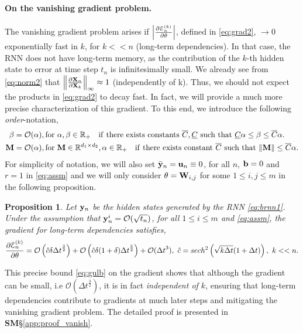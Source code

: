 \documentclass{article} \usepackage{iclr2021_conference,times}
\newtheorem{proposition}[theorem]{Proposition}
\newcommand{\by}{{\bf y}}
\newcommand{\bW}{{\bf W}}
\newcommand{\bu}{{\bf u}}
\newcommand{\bb}{{\bf b}}
\newcommand{\bX}{{\bf X}}
\newcommand{\ord}{{\mathcal O}}
\newcommand{\R}{{\mathbb R}}
\newcommand{\Dt}{{\Delta t}}
\newcommand{\E}{\EuScript{E}}
\begin{document}
\paragraph{On the vanishing gradient problem.} The vanishing gradient problem \citep{vanish_grad} arises if $\left | \frac{\partial \E^{(k)}_n}{\partial \theta} \right |$, defined in \eqref{eq:grad2}, $\rightarrow 0$ exponentially fast in $k$, for $k << n$ (long-term dependencies). In that case, the RNN does not have long-term memory, as the contribution of the $k$-th hidden state to error at time step $t_n$ is infinitesimally small. We already see from \eqref{eq:norm2} that $\left \| \frac{\partial \bX_n}{\partial \bX_{k}} \right\|_\infty \approx 1$ (independently of k). Thus, we should not expect the products in \eqref{eq:grad2} to decay fast. In fact, we will provide a much more precise characterization of this gradient. To this end, we introduce the following \emph{order}-notation,
\begin{equation}
    \label{eq:ord}
    \begin{aligned}
   {\bf \beta} &= \ord(\alpha), {\rm for}~\alpha,\beta \in \R_+ \quad {\rm if~there~exists~constants}~ \overline{C},\underline{C}~{\rm such~that}~\underline{C} \alpha \leq \beta \leq \overline{C} \alpha. \\
   {\bf M} &= \ord(\alpha), {\rm for}~{\bf M} \in \R^{d_1 \times d_2}, \alpha \in \R_+ \quad {\rm if~there~exists~constant}~ \overline{C}~{\rm such~that}~\|{\bf M}\| \leq \overline{C} \alpha.
   \end{aligned}
\end{equation}
For simplicity of notation, we will also set $\bar{\by}_n = \bu_n \equiv 0$, for all $n$, $\bb=0$ and $r=1$ in \eqref{eq:assm} and we will only consider $\theta = \bW_{i,j}$ for some $1\leq i,j \leq m$ in the following proposition.
\begin{proposition}
\label{prop:4}
Let $\by_n$ be the hidden states generated by the RNN \eqref{eq:brnn1}. Under the assumption that $\by^i_n = \ord(\sqrt{t_n})$, for all $1 \leq i \leq m$ and \eqref{eq:assm}, the gradient for long-term dependencies satisfies,
\begin{equation}
    \label{eq:gulb}
    \frac{\partial \E^{(k)}_n}{\partial \theta} = \ord\left(\hat{c}\delta \Dt^{\frac{3}{2}}\right) + \ord\left(\hat{c}\delta(1+\delta) \Dt^{\frac{5}{2}}\right) + \ord(\Dt^3),~ \hat{c} = sech^2\left(\sqrt{k\Dt}(1+\Dt)\right),
     ~k << n. 
\end{equation}
\end{proposition}
This precise bound \eqref{eq:gulb} on the gradient shows that although the gradient can be small, i.e $\ord(\Dt^{\frac{3}{2}})$, it is in fact \emph{independent of $k$}, ensuring that long-term dependencies contribute to gradients at much later steps and mitigating the vanishing gradient problem. The detailed proof is presented in   {\bf SM}\S\ref{app:proof_vanish}.
\end{document}
